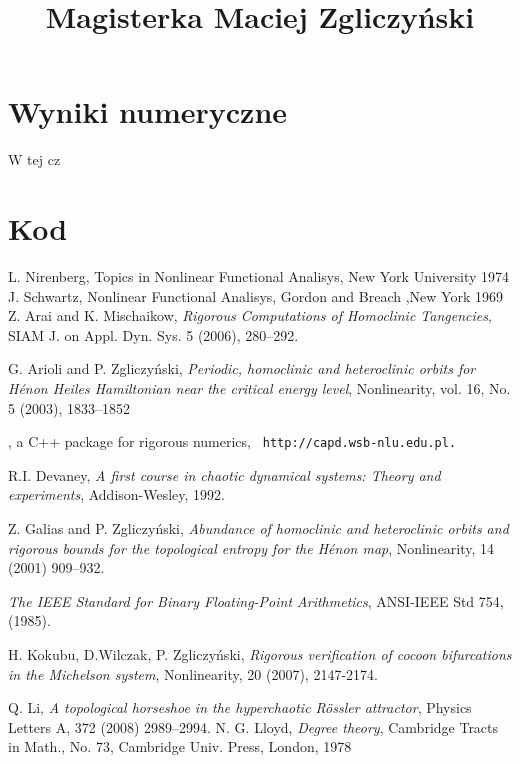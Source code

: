 \documentclass[10pt,a4paper]{article}
\begin{document}
\title{Magisterka Maciej Zgliczyński}










\section{Wyniki numeryczne}

W tej cz

\section{Kod}


\begin{thebibliography}{GSS}

 L. Nirenberg, Topics in Nonlinear Functional Analisys, New York University  1974
 J. Schwartz, Nonlinear Functional Analisys, Gordon and Breach ,New York 1969 
 Z. Arai and K. Mischaikow, \emph{Rigorous Computations of Homoclinic Tangencies}, SIAM J. on Appl. Dyn. Sys. 5 (2006), 280--292.


 G. Arioli and P. Zgliczy\'nski, \emph{Periodic, homoclinic and heteroclinic orbits
for H\'{e}non Heiles Hamiltonian near the critical energy level},
Nonlinearity, vol. 16, No. 5 (2003), 1833--1852

, a C++ package for rigorous numerics, {\tt
http://capd.wsb-nlu.edu.pl.}

 R.I. Devaney, \emph{A first course in chaotic dynamical systems: Theory and
experiments}, Addison-Wesley, 1992.

 Z. Galias and P. Zgliczy\'nski, \emph{Abundance of homoclinic and heteroclinic orbits and
rigorous bounds for the topological entropy for the H\'enon map},
Nonlinearity, 14 (2001) 909--932.

 \emph{The IEEE Standard for Binary Floating-Point
Arithmetics}, ANSI-IEEE Std 754, (1985).

 H. Kokubu, D.Wilczak,  P. Zgliczy\'nski,
 \emph{Rigorous verification of cocoon bifurcations in the Michelson
system}, Nonlinearity, 20 (2007), 2147-2174.

 Q. Li, \emph{A topological horseshoe in the hyperchaotic R\"ossler attractor},
Physics Letters A, 372 (2008) 2989--2994.
 N. G. Lloyd, \emph{Degree theory}, Cambridge
Tracts in Math., No. 73, Cambridge Univ. Press, London, 1978


\end{thebibliography}
\end{document}
